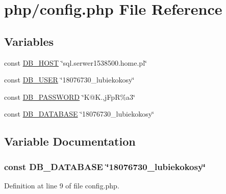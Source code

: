 \hypertarget{php_2config_8php}{}\section{php/config.php File Reference}
\label{php_2config_8php}
\subsection*{Variables}
\begin{DoxyCompactItemize}
\item 
const \hyperlink{php_2config_8php_a293363d7988627f671958e2d908c202a}{D\+B\+\_\+\+H\+O\+S\+T} \char`\"{}sql.\+serwer1538500.\+home.\+pl\char`\"{}
\item 
const \hyperlink{php_2config_8php_a1d1d99f8e08f387d84fe9848f3357156}{D\+B\+\_\+\+U\+S\+E\+R} \char`\"{}18076730\+\_\+lubiekokosy\char`\"{}
\item 
const \hyperlink{php_2config_8php_a4dca144fafcc7bd3f71cb5778afcdd13}{D\+B\+\_\+\+P\+A\+S\+S\+W\+O\+R\+D} \char`\"{}K@K.,j\+Fp\+R\%a3\char`\"{}
\item 
const \hyperlink{php_2config_8php_a4798f8ff41893eb12308c2b638b8becf}{D\+B\+\_\+\+D\+A\+T\+A\+B\+A\+S\+E} \char`\"{}18076730\+\_\+lubiekokosy\char`\"{}
\end{DoxyCompactItemize}


\subsection{Variable Documentation}
\hypertarget{php_2config_8php_a4798f8ff41893eb12308c2b638b8becf}{}
\subsubsection[{D\+B\+\_\+\+D\+A\+T\+A\+B\+A\+S\+E}]{\setlength{\rightskip}{0pt plus 5cm}const D\+B\+\_\+\+D\+A\+T\+A\+B\+A\+S\+E \char`\"{}18076730\+\_\+lubiekokosy\char`\"{}}\label{php_2config_8php_a4798f8ff41893eb12308c2b638b8becf}


Definition at line 9 of file config.\+php.

\hypertarget{php_2config_8php_a293363d7988627f671958e2d908c202a}{}
